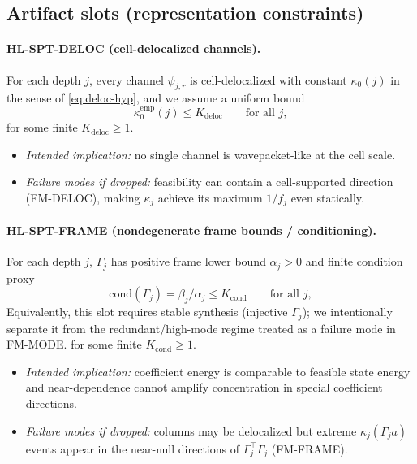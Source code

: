 \documentclass[11pt]{article}
\begin{document}
\subsection{Artifact slots (representation constraints)}

\paragraph{\textbf{HL-SPT-DELOC} (cell-delocalized channels).}
For each depth $j$, every channel $\psi_{j,r}$ is cell-delocalized with constant $\kappa_0(j)$ in the sense of \eqref{eq:deloc-hyp}, and we assume a uniform bound
\begin{equation}\label{eq:HL-DELOC}
\kappa^{\mathrm{emp}}_0(j)\le K_{\mathrm{deloc}}
\qquad \text{for all } j,
\end{equation}
for some finite $K_{\mathrm{deloc}}\ge 1$.
\begin{itemize}
\item \emph{Intended implication:} no single channel is wavepacket-like at the cell scale.
\item \emph{Failure modes if dropped:} feasibility can contain a cell-supported direction (FM-DELOC), making $\kappa_j$ achieve its maximum $1/f_j$ even statically.
\end{itemize}

\paragraph{\textbf{HL-SPT-FRAME} (nondegenerate frame bounds / conditioning).}
For each depth $j$, $\Gamma_j$ has positive frame lower bound $\alpha_j>0$ and finite condition proxy
\begin{equation}\label{eq:HL-FRAME}
\mathrm{cond}(\Gamma_j)=\beta_j/\alpha_j \le K_{\mathrm{cond}}
\qquad \text{for all } j,
\end{equation}
Equivalently, this slot requires stable synthesis (injective $\Gamma_j$); we intentionally separate it from the redundant/high-mode regime treated as a failure mode in FM-MODE.
for some finite $K_{\mathrm{cond}}\ge 1$.
\begin{itemize}
\item \emph{Intended implication:} coefficient energy is comparable to feasible state energy and near-dependence cannot amplify concentration in special coefficient directions.
\item \emph{Failure modes if dropped:} columns may be delocalized but extreme $\kappa_j(\Gamma_j a)$ events appear in the near-null directions of $\Gamma_j^\top\Gamma_j$ (FM-FRAME).
\end{itemize}
\end{document}
